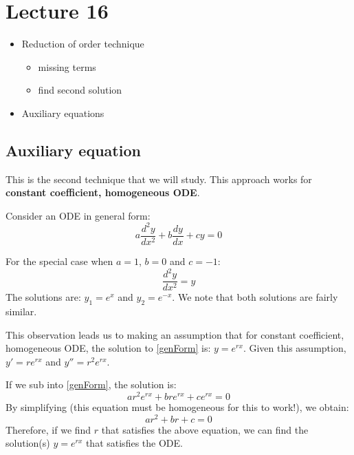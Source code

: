 \chapter*{Lecture 16}
\begin{recall}{}{}
\begin{itemize}
\item Reduction of order technique
\begin{itemize}
\item missing terms
\item find second solution
\end{itemize}
\item Auxiliary equations
\end{itemize}
\end{recall}




\section{Auxiliary equation} 
This is the second technique that we will study. This approach works for \textbf{constant coefficient, homogeneous ODE}.

Consider an ODE in general form:
\begin{equation}
\boxed{a\frac{d^2 y}{dx^2}+b\frac{d y}{dx}+cy=0}
\label{genForm} 
\end{equation}

For the special case when $a=1$, $b=0$ and $c=-1$:
\begin{equation*}
\frac{d^2 y}{dx^2}=y
\end{equation*}
The solutions are: $y_1=e^x$ and $y_2=e^{-x}$. We note that both solutions are fairly similar.

This observation leads us to making an assumption that for constant coefficient, homogeneous ODE, the solution to \eqref{genForm} is: $y=e^{rx}$. Given this assumption, $y'=re^{rx}$ and $y''=r^2e^{rx}$.

If we sub into \eqref{genForm}, the solution is:
\begin{equation*}
ar^2e^{rx}+b r e^{rx} +ce^{rx}=0
\end{equation*}
By simplifying (this equation must be homogeneous for this to work!), we obtain:
\begin{equation}
\boxed{ar^2+b r  +c=0}
\label{auxi}
\end{equation}
Therefore, if we find $r$ that satisfies the above equation, we can find the solution(s) $y=e^{rx}$ that satisfies the ODE.

